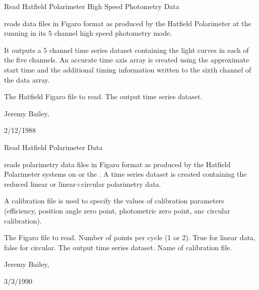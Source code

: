 \begin{manroutinedescription}
        Read Hatfield Polarimeter High Speed Photometry Data

        {} reads data files in Figaro format as produced
        by the Hatfield Polarimeter at the {} running in its
        5 channel high speed photometry mode.

        It outputs a 5 channel {} time series dataset containing
        the light curves in each of the five channels. An accurate
        time axis array is created using the approximate start time
        and the additional timing information written to the sixth
        channel of the data array.

\begin{manparametertable}
     The Hatfield Figaro file to %
read.
  The %
output time series dataset.

\end{manparametertable}
         Jeremy Bailey, {}

         2/12/1988

\end{manroutinedescription}
\begin{manroutinedescription}
        Read Hatfield Polarimeter Data

        {} reads polarimetry data files in Figaro format as %
produced
        by the Hatfield Polarimeter systems on {} or the {}.
        A time series dataset is created containing the reduced linear
        or linear+circular polarimetry data.

        A calibration file is used to specify the values of calibration
        parameters (efficiency, position angle zero point, photometric
        zero point, anc circular calibration).

\begin{manparametertable}
     The {} Figaro %
file to read.
  Number of points per cycle (1 %
or 2).
  True for linear data, false %
for circular.
  The %
output time series dataset.
     Name of calibration file.

\end{manparametertable}
         Jeremy Bailey, {}

         3/3/1990

\end{manroutinedescription}
